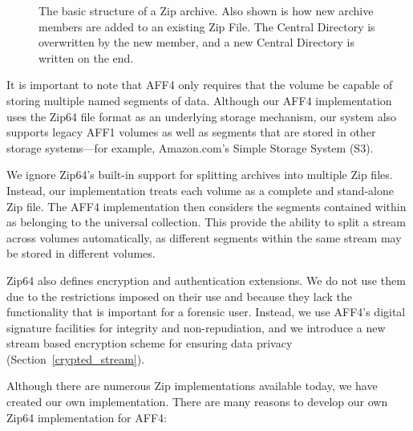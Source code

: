 \documentclass[10pt, conference]{IEEEtran}
\begin{document}
\begin{figure}[tbp]
  \begin{center}
  \mbox{\columnwidth {}}

  \caption{The basic structure of a Zip archive. Also shown is how new
  archive members are added to an existing Zip File. The Central
  Directory is overwritten by the new member, and a new Central
  Directory is written on the end.  }

  \label{zip_structure}
  \end{center}
\end{figure}

It is important to note that AFF4 only requires that the volume be
capable of storing multiple named segments of data. Although our AFF4
implementation uses the Zip64 file format as an underlying storage
mechanism, our system also supports legacy AFF1 volumes as well as
segments that are stored in other storage systems---for example,
Amazon.com's Simple Storage System (S3)\cite{s3-aws-home-page-money}.

We ignore Zip64's built-in support for splitting archives into
multiple Zip files. Instead, our implementation treats each volume as
a complete and stand-alone Zip file. The AFF4 implementation then
considers the segments contained within as belonging to the universal
collection. This provide the ability to split a stream across volumes
automatically, as different segments within the same stream may be
stored in different volumes.

Zip64 also defines encryption and authentication extensions. We do not
use them due to the restrictions imposed on their use and because they
lack the functionality that is important for a forensic user. Instead,
we use AFF4's digital signature facilities for integrity and
non-repudiation, and we introduce a new stream based encryption scheme
for ensuring data privacy (Section~\ref{crypted_stream}).

Although there are numerous Zip implementations available today, we
have created our own implementation. There are many reasons to develop
our own Zip64 implementation for AFF4:
\end{document}
